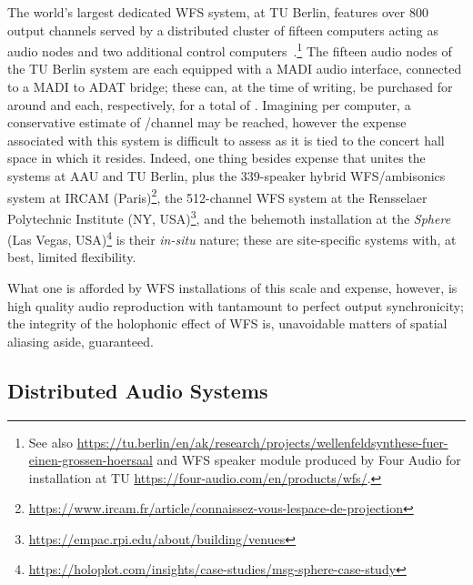 \documentclass[utf8]{FrontiersinHarvard}
\begin{document}
    The world's largest dedicated WFS system, at TU Berlin, features over 800
    output channels served by a distributed cluster of fifteen computers acting
    as audio nodes and two additional control
    computers~\citep{baalman_renewed_2007}.\footnote{
        See also
        \url{https://tu.berlin/en/ak/research/projects/wellenfeldsynthese-fuer-einen-grossen-hoersaal}
        and WFS speaker module produced by Four Audio for installation at TU
        \url{https://four-audio.com/en/products/wfs/}.
    }
    The fifteen audio nodes of the TU Berlin system are each equipped with a
    MADI audio interface, connected to a MADI to ADAT bridge;
    these can, at the time of writing, be purchased for around
     and  each, respectively, for a
    total of .
    Imagining  per computer, a conservative estimate of
    /channel may be reached, however the expense associated with
    this  system is difficult to assess as it is tied to the concert hall space
    in which it resides.
    Indeed, one thing besides expense that unites the systems at AAU and TU
    Berlin, plus the 339-speaker hybrid WFS/ambisonics system at IRCAM
    (Paris)\footnote{
        \url{https://www.ircam.fr/article/connaissez-vous-lespace-de-projection}
    }, the 512-channel WFS system at the Rensselaer Polytechnic Institute (NY,
    USA)\footnote{
        \url{https://empac.rpi.edu/about/building/venues}
    }, and the behemoth installation at the \textit{Sphere} (Las
    Vegas, USA)\footnote{
        \url{https://holoplot.com/insights/case-studies/msg-sphere-case-study}
    } is their \textit{in-situ} nature;
    these are site-specific systems with, at best, limited flexibility.

    What one is afforded by WFS installations of this scale and expense, however, is
    high quality audio reproduction with tantamount to perfect output synchronicity;
    the integrity of the holophonic effect of WFS is, unavoidable matters of spatial
    aliasing aside, guaranteed.

    \subsection{Distributed Audio Systems}\label{subsec:distributed-audio-systems}
\end{document}
